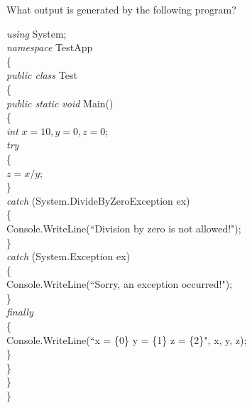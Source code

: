 {\begin{list}{E \thechapter.\theenumi}

\item What output is generated by the following program?

\emph{using} System;\\
\emph{namespace} TestApp\\
\{\\
\hspace*{0.2in} \emph{public class} Test\\
\hspace*{0.2in}   \{\\
\hspace*{0.4in}        \emph{public static void} Main()\\
\hspace*{0.4in}        \{\\
\hspace*{0.6in}            \emph{int} $x = 10, y = 0, z = 0$;\\
\hspace*{0.6in}            \emph{try}\\
\hspace*{0.6in}            \{\\
\hspace*{0.8in}                $z = x / y$;\\
\hspace*{0.6in}            \}\\
\hspace*{0.6in}            \emph{catch} (System.DivideByZeroException ex)\\
\hspace*{0.6in}            \{\\
\hspace*{0.8in}                Console.WriteLine(``Division by
zero is not allowed!");\\
\hspace*{0.6in}            \}\\
\hspace*{0.6in}            \emph{catch} (System.Exception ex)\\
\hspace*{0.6in}            \{\\
\hspace*{0.8in}                Console.WriteLine(``Sorry, an
exception occurred!");\\
\hspace*{0.6in}            \}\\
\hspace*{0.6in}            \emph{finally}\\
\hspace*{0.6in}            \{\\
\hspace*{0.8in} Console.WriteLine(``x = \{0\}  y =
\{1\}  z = \{2\}", x, y, z);\\
\hspace*{0.6in}            \}\\
\hspace*{0.4in}        \}\\
\hspace*{0.2in}    \}\\
\}


\end{list}}
